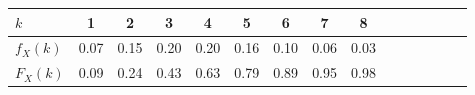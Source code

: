 \documentclass{standalone}
\begin{document}
\begin{tabular}{l | c c c c c c c c c c c c c c}
	\hline
	$k$ & 1 & 2 & 3 & 4 & 5 & 6 & 7 & 8 \\ 
	\hline
	$f_X(k)$ & 0.07 & 0.15 & 0.20 & 0.20 & 0.16 & 0.10 & 0.06 & 0.03 \\ 
	$F_X(k)$ & 0.09 & 0.24 & 0.43 & 0.63 & 0.79 & 0.89 & 0.95 & 0.98 \\
	\hline
\end{tabular}
\end{document}
